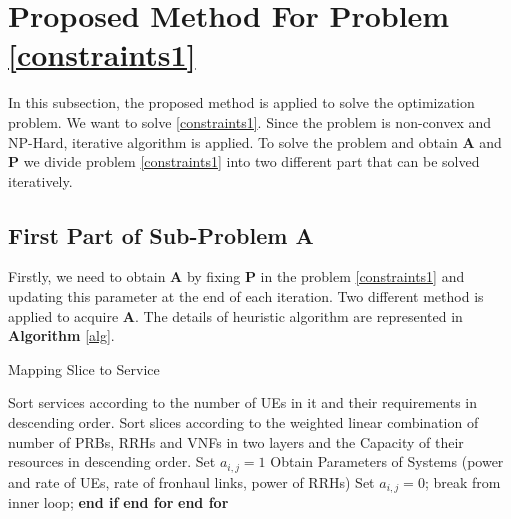 \documentclass[conference]{IEEEtran}
\begin{document}
\section{Proposed Method For Problem \eqref{constraints1}}
In this subsection, the proposed method is applied to solve the optimization problem.
We want to solve \eqref{constraints1}. Since the problem is non-convex and NP-Hard, iterative algorithm is applied.
To solve the problem and obtain $\boldsymbol{A}$ and $\boldsymbol{P}$ we divide problem \eqref{constraints1} into 
two different part that can be solved iteratively.  
\subsection{First Part of Sub-Problem A}\label{firstsub}
Firstly, we need to obtain $\boldsymbol{A}$ by fixing $\boldsymbol{P}$ in the problem \eqref{constraints1} and updating this parameter at the end of each iteration. Two different method is applied to acquire $\boldsymbol{A}$. 
The details of heuristic algorithm are represented in \textbf{Algorithm} \eqref{alg}.  
\begin{algorithm}
\caption{Mapping Slice to Service}\label{alg}
\begin{algorithmic}[1]
\State Sort services according to the number of UEs in it and their requirements in descending order.
\State Sort slices according to the weighted linear combination of number of PRBs, RRHs and VNFs in two layers and the Capacity of their resources in descending order. 
\State Set $a_{i,j} = 1$
\State Obtain Parameters of Systems (power and rate of UEs, rate of fronhaul links, power of RRHs)
\State Set $a_{i,j} = 0$;
\Else
\State break from inner loop;
\EndIf 
\State \textbf{end if}
\EndFor 
\State \textbf{end for}
\EndFor 
\State \textbf{end for}
\end{algorithmic}
\end{algorithm}
\end{document}
